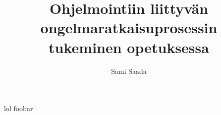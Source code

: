 \documentclass[a4paper]{article}
\author{Sami Saada}
\title{Ohjelmointiin liittyvän ongelmaratkaisuprosessin tukeminen opetuksessa}
\begin{document}
\maketitle \thispagestyle{empty}

\newpage

\setcounter{page}{1}

lol foobar
\end{document}
